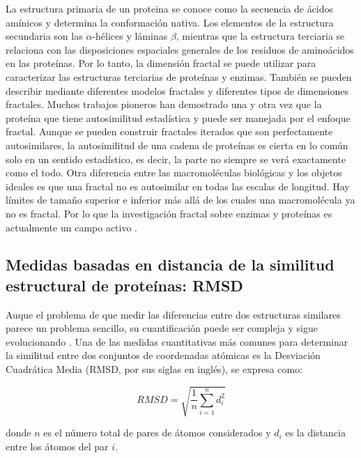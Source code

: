 \documentclass[11pt]{article}
\begin{document}
La estructura primaria de un proteina se conoce como la secuencia de \'{a}cidos am\'{i}nicos y determina la conformaci\'{o}n nativa. Los elementos de la estructura secundaria son las $\alpha$-h\'{e}lices y l\'{a}minas $\beta$, mientras que la estructura terciaria se relaciona con las disposiciones espaciales generales de los residuos de amino\'{a}cidos en las prote\'{i}nas. Por lo tanto, la dimensi\'{o}n fractal se puede utilizar para caracterizar las estructuras terciarias de prote\'{i}nas y enzimas. Tambi\'{e}n se pueden describir mediante diferentes modelos fractales y diferentes tipos de dimensiones fractales. Muchos trabajos pioneros han demostrado una y otra vez que la prote\'{i}na que tiene autosimilitud estad\'{i}stica y puede ser manejada por el enfoque fractal. Aunque se pueden construir fractales iterados que son perfectamente autosimilares, la autosimilitud de una cadena de prote\'{i}nas es cierta en lo com\'{u}n solo en un sentido estad\'{i}stico, es decir, la parte no siempre se ver\'{a} exactamente como el todo. Otra diferencia entre las macromol\'{e}culas biol\'{o}gicas y los objetos ideales es que una fractal no es autosimilar en todas las escalas de longitud. Hay l\'{i}mites de tamaño superior e inferior m\'{a}s all\'{a} de los cuales una macromol\'{e}cula ya no es fractal. Por lo que la investigaci\'{o}n fractal sobre enzimas y prote\'{i}nas es actualmente un campo activo \cite{Mustafa1996}. 



\subsection{Medidas basadas en distancia de la similitud estructural de prote\'{i}nas: RMSD}

Auque el problema de que medir las diferencias entre dos estructuras similares 
parece un problema sencillo, su cuantificaci\'{o}n puede ser compleja 
y sigue evolucionando \cite{Kufareva2012}. Una de las medidas 
cuantitativas m\'{a}s comunes para determinar la similitud entre 
dos conjuntos de coordenadas at\'{o}micas es la Desviaci\'{o}n Cuadr\'{a}tica Media 
(RMSD, por sus siglas en ingl\'{e}s), se expresa como:

\begin{equation}
RMSD = \sqrt{\frac{1}{n} \sum_{i=1}^{n} d_i^2}
\end{equation}

donde \(n\) es el n\'{u}mero total de pares de \'{a}tomos considerados 
y \(d_i\) es la distancia entre los \'{a}tomos del par \(i\).
\end{document}
